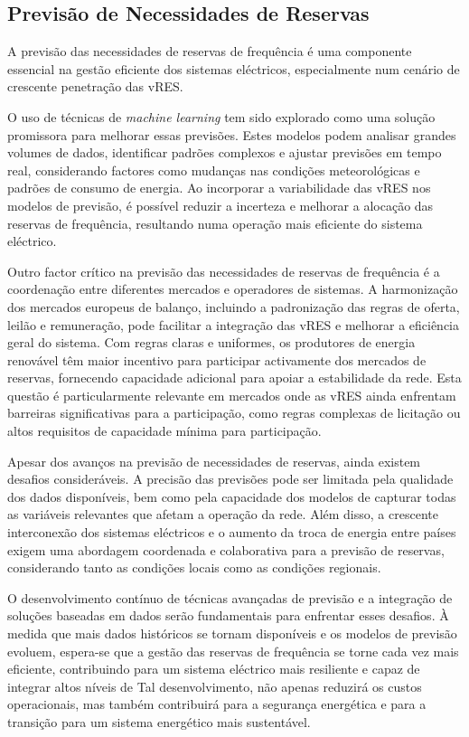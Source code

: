 \subsection{Previsão de Necessidades de Reservas \label{se:pred_impact_vres}}

A previsão das necessidades de reservas de frequência é uma componente essencial na gestão eficiente dos sistemas eléctricos, especialmente num cenário de crescente penetração das \gls{vRES}.\par
O uso de técnicas de \textit{machine learning} tem sido explorado como uma solução promissora para melhorar essas previsões. Estes modelos podem analisar grandes volumes de dados, identificar padrões complexos e ajustar previsões em tempo real, considerando factores como mudanças nas condições meteorológicas e padrões de consumo de energia. Ao incorporar a variabilidade das \gls{vRES} nos modelos de previsão, é possível reduzir a incerteza e melhorar a alocação das reservas de frequência, resultando numa operação mais eficiente do sistema eléctrico.\par
Outro factor crítico na previsão das necessidades de reservas de frequência é a coordenação entre diferentes mercados e operadores de sistemas. A harmonização dos mercados europeus de balanço, incluindo a padronização das regras de oferta, leilão e remuneração, pode facilitar a integração das \gls{vRES} e melhorar a eficiência geral do sistema. Com regras claras e uniformes, os produtores de energia renovável têm maior incentivo para participar activamente dos mercados de reservas, fornecendo capacidade adicional para apoiar a estabilidade da rede. Esta questão é particularmente relevante em mercados onde as \gls{vRES} ainda enfrentam barreiras significativas para a participação, como regras complexas de licitação ou altos requisitos de capacidade mínima para participação.\par
Apesar dos avanços na previsão de necessidades de reservas, ainda existem desafios consideráveis. A precisão das previsões pode ser limitada pela qualidade dos dados disponíveis, bem como pela capacidade dos modelos de capturar todas as variáveis relevantes que afetam a operação da rede. Além disso, a crescente interconexão dos sistemas eléctricos e o aumento da troca de energia entre países exigem uma abordagem coordenada e colaborativa para a previsão de reservas, considerando tanto as condições locais como as condições regionais.\par
O desenvolvimento contínuo de técnicas avançadas de previsão e a integração de soluções baseadas em dados serão fundamentais para enfrentar esses desafios. À medida que mais dados históricos se tornam disponíveis e os modelos de previsão evoluem, espera-se que a gestão das reservas de frequência se torne cada vez mais eficiente, contribuindo para um sistema eléctrico mais resiliente e capaz de integrar altos níveis de Tal desenvolvimento, não apenas reduzirá os custos operacionais, mas também contribuirá para a segurança energética e para a transição para um sistema energético mais sustentável.\par

